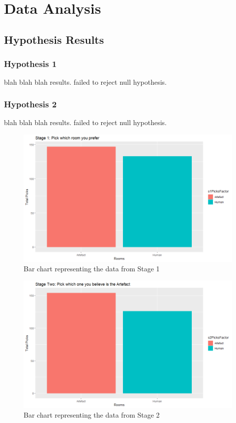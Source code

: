 \section{Data Analysis}

\subsection{Hypothesis Results}
\subsubsection{Hypothesis 1}
blah blah blah results. failed to reject null hypothesis.

\subsubsection{Hypothesis 2}
blah blah blah results. failed to reject null hypothesis.

\begin{figure}[!ht]
    \includegraphics[width=\columnwidth]{./Images/stage-1-picks-graph.png}
    \centering
    \caption{Bar chart representing the data from Stage 1}
    \label{stage-1-graph}
\end{figure}

\begin{figure}[!ht]
    \includegraphics[width=\columnwidth]{./Images/stage-2-picks-graph.png}
    \centering
    \caption{Bar chart representing the data from Stage 2}
    \label{stage-2-graph}
\end{figure}